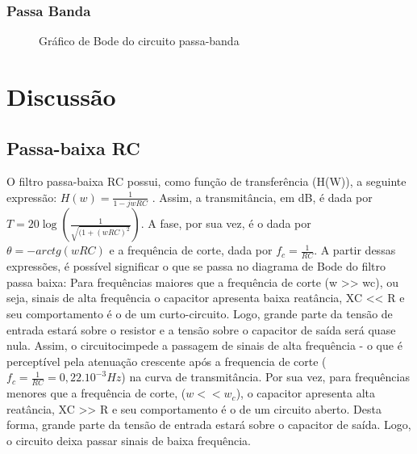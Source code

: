 \documentclass[a4paper]{article}
\begin{document}
	\subsubsection{Passa Banda}
		\begin{figure} [H] 
			\centering
			\caption{Gráfico de Bode do circuito passa-banda}
			\label{fig:graphD2}
		\end{figure}
        
\section{Discussão}

\subsection{Passa-baixa RC}

O filtro passa-baixa RC possui, como função de transferência (H(W)), a seguinte expressão: $H(w) = \frac{1}{ 1 - jwRC}$ . Assim, a transmitância, em dB, é dada por $T = 20\log (\frac{1}{\sqrt{(1 + (wRC)^2}})$. A fase, por sua vez, é o dada por $\theta = -arctg(wRC)$ e a frequência de corte, dada por $f_{c} = \frac{1}{RC}$. A partir dessas expressões, é possível significar o que se passa no diagrama de Bode do filtro passa baixa: Para frequências maiores que a frequência de corte (w >> wc), ou seja, sinais de alta frequência o capacitor apresenta baixa reatância, XC << R e seu comportamento é o de um curto-circuito. Logo, grande parte da tensão de entrada
estará sobre o resistor e a tensão sobre o capacitor de saída será quase nula. Assim, o circuitocimpede a passagem de sinais de alta frequência - o que é perceptível pela atenuação crescente após a frequencia de corte ($f_{c} = \frac{1}{RC} = 0,22.10^{-3} Hz$) na curva de transmitância. Por sua vez, para frequências menores que a frequência de corte, ($w << w_{c}$), o capacitor apresenta alta reatância, XC >> R e seu comportamento é o de um circuito aberto. Desta forma, grande parte da tensão de entrada estará sobre o capacitor de saída. Logo, o circuito deixa passar sinais
de baixa frequência.  
\end{document}
